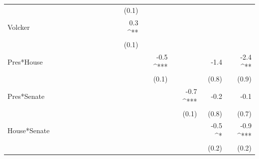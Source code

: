 \documentclass[a4paper]{article}\usepackage{graphicx, color}
\begin{document}
\begin{table}[ht]
\begin{center}
{\begin{tabular}{ l D{.}{.}{1}D{.}{.}{1}D{.}{.}{1}D{.}{.}{1}D{.}{.}{1}D{.}{.}{1}D{.}{.}{1}D{.}{.}{1}D{.}{.}{1}D{.}{.}{1}D{.}{.}{1}D{.}{.}{1}D{.}{.}{1}D{.}{.}{1} }
                     &                 &                 &                 &                 &                 &                 &                 &                 &                 & (0.1)           &                 &                 &                 &                \\ 
Volcker              &                 &                 &                 &                 &                 &                 &                 &                 &                 & 0.3 ^{**}       &                 &                 &                 &                \\ 
                     &                 &                 &                 &                 &                 &                 &                 &                 &                 & (0.1)           &                 &                 &                 &                \\ 
Pres*House           &                 &                 &                 &                 &                 &                 &                 &                 &                 &                 & -0.5 ^{***}     &                 & -1.4            & -2.4 ^{**}     \\ 
                     &                 &                 &                 &                 &                 &                 &                 &                 &                 &                 & (0.1)           &                 & (0.8)           & (0.9)          \\ 
Pres*Senate          &                 &                 &                 &                 &                 &                 &                 &                 &                 &                 &                 & -0.7 ^{***}     & -0.2            & -0.1           \\ 
                     &                 &                 &                 &                 &                 &                 &                 &                 &                 &                 &                 & (0.1)           & (0.8)           & (0.7)          \\ 
House*Senate         &                 &                 &                 &                 &                 &                 &                 &                 &                 &                 &                 &                 & -0.5 ^*         & -0.9 ^{***}    \\ 
                     &                 &                 &                 &                 &                 &                 &                 &                 &                 &                 &                 &                 & (0.2)           & (0.2)          \\ 

\end{tabular}}
\end{center}
\end{table}
\end{document}
